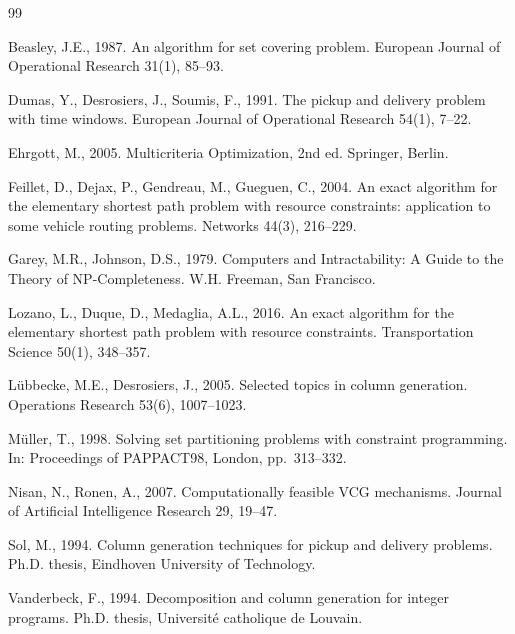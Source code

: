 \documentclass[11pt]{article}
\theoremstyle{definition}
\theoremstyle{remark}
\begin{document}
\FloatBarrier
\begin{thebibliography}{99}
\setlength{\itemsep}{2pt}
\small

Beasley, J.E., 1987. An algorithm for set covering problem. European Journal of
Operational Research 31(1), 85--93. %

Dumas, Y., Desrosiers, J., Soumis, F., 1991. The pickup and delivery problem
with time windows. European Journal of Operational Research 54(1), 7--22.

Ehrgott, M., 2005. Multicriteria Optimization, 2nd ed. Springer, Berlin.

Feillet, D., Dejax, P., Gendreau, M., Gueguen, C., 2004. An exact algorithm for
the elementary shortest path problem with resource constraints: application to
some vehicle routing problems. Networks 44(3), 216--229. %

Garey, M.R., Johnson, D.S., 1979. Computers and Intractability: A Guide to the
Theory of NP-Completeness. W.H. Freeman, San Francisco.

Lozano, L., Duque, D., Medaglia, A.L., 2016. An exact algorithm for the
elementary shortest path problem with resource constraints. Transportation
Science 50(1), 348--357. %

L{\"u}bbecke, M.E., Desrosiers, J., 2005. Selected topics in column generation.
Operations Research 53(6), 1007--1023.

M{\"u}ller, T., 1998. Solving set partitioning problems with constraint
programming. In: Proceedings of PAPPACT98, London, pp.~313--332. %

Nisan, N., Ronen, A., 2007. Computationally feasible VCG mechanisms. Journal of
Artificial Intelligence Research 29, 19--47. %

Sol, M., 1994. Column generation techniques for pickup and delivery problems.
Ph.D. thesis, Eindhoven University of Technology. %

Vanderbeck, F., 1994. Decomposition and column generation for integer programs.
Ph.D. thesis, Universit{\'e} catholique de Louvain. %

\end{thebibliography}
\end{document}
